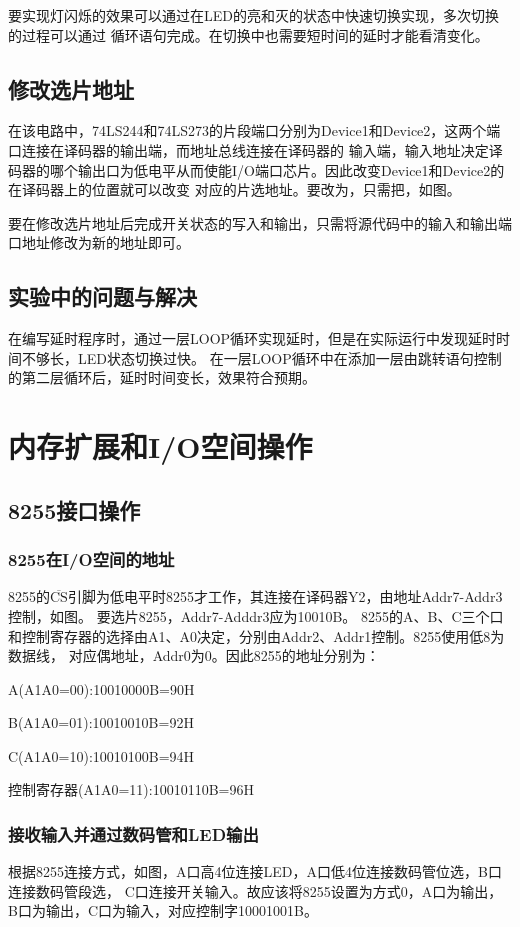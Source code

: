 \documentclass[12pt, a4paper, oneside]{ctexart}
\begin{document}
    要实现灯闪烁的效果可以通过在LED的亮和灭的状态中快速切换实现，多次切换的过程可以通过
    循环语句完成。在切换中也需要短时间的延时才能看清变化。
    \subsection{修改选片地址}
    在该电路中，74LS244和74LS273的片段端口分别为Device1和Device2，这两个端口连接在译码器的输出端，而地址总线连接在译码器的
    输入端，输入地址决定译码器的哪个输出口为低电平从而使能I/O端口芯片。因此改变Device1和Device2的在译码器上的位置就可以改变
    对应的片选地址。要改为，只需把，如图。

    要在修改选片地址后完成开关状态的写入和输出，只需将源代码中的输入和输出端口地址修改为新的地址即可。

    \subsection{实验中的问题与解决}
    在编写延时程序时，通过一层LOOP循环实现延时，但是在实际运行中发现延时时间不够长，LED状态切换过快。
    在一层LOOP循环中在添加一层由跳转语句控制的第二层循环后，延时时间变长，效果符合预期。
    \section{内存扩展和I/O空间操作}
    \subsection{8255接口操作}
    \subsubsection{8255在I/O空间的地址}
    8255的$\overline{\text{CS}}$引脚为低电平时8255才工作，其连接在译码器Y2，由地址Addr7-Addr3控制，如图。
    要选片8255，Addr7-Adddr3应为10010B。
    8255的A、B、C三个口和控制寄存器的选择由A1、A0决定，分别由Addr2、Addr1控制。8255使用低8为数据线，
    对应偶地址，Addr0为0。因此8255的地址分别为：

    A(A1A0=00):10010000B=90H

    B(A1A0=01):10010010B=92H

    C(A1A0=10):10010100B=94H

    控制寄存器(A1A0=11):10010110B=96H
    \subsubsection{接收输入并通过数码管和LED输出}
    根据8255连接方式，如图，A口高4位连接LED，A口低4位连接数码管位选，B口连接数码管段选，
    C口连接开关输入。故应该将8255设置为方式0，A口为输出，B口为输出，C口为输入，对应控制字10001001B。
\end{document}
